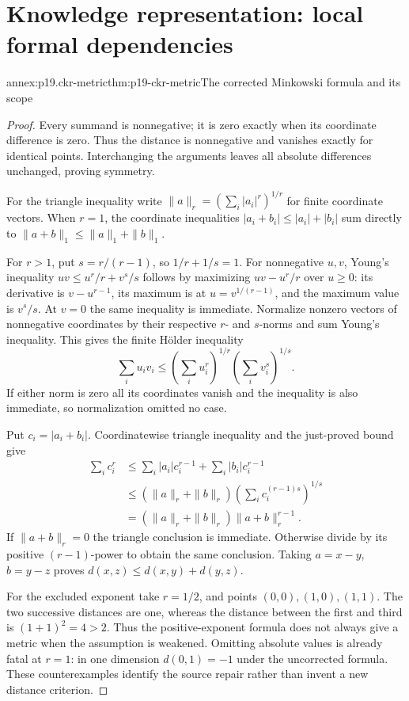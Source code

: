 \section{Knowledge representation: local formal dependencies}
\label{sec:p19-ckr-annex}

\begin{annexitem}{annex:p19.ckr-metric}{thm:p19-ckr-metric}{The corrected Minkowski formula and its scope}
\begin{proof}
Every summand is nonnegative; it is zero exactly when its coordinate
difference is zero. Thus the distance is nonnegative and vanishes
exactly for identical points. Interchanging the arguments leaves
all absolute differences unchanged, proving symmetry.

For the triangle inequality write \(\|a\|_r=(\sum_i|a_i|^r)^{1/r}\)
for finite coordinate vectors. When \(r=1\), the coordinate
inequalities \(|a_i+b_i|\leq|a_i|+|b_i|\) sum directly to
\(\|a+b\|_1\leq\|a\|_1+\|b\|_1\).

For \(r>1\), put \(s=r/(r-1)\), so \(1/r+1/s=1\).
For nonnegative \(u,v\), Young's inequality
\(uv\leq u^r/r+v^s/s\) follows by maximizing
\(uv-u^r/r\) over \(u\geq0\): its derivative is
\(v-u^{r-1}\), its maximum is at \(u=v^{1/(r-1)}\),
and the maximum value is \(v^s/s\). At \(v=0\) the
same inequality is immediate. Normalize nonzero vectors of
nonnegative coordinates by their respective \(r\)- and
\(s\)-norms and sum Young's inequality. This gives the finite
H\"older inequality
\[
 \sum_i u_iv_i\leq
    \left(\sum_i u_i^r\right)^{1/r}
    \left(\sum_i v_i^s\right)^{1/s}.
\]
If either norm is zero all its coordinates vanish and the
inequality is also immediate, so normalization omitted no case.

Put \(c_i=|a_i+b_i|\). Coordinatewise triangle inequality
and the just-proved bound give
\[
\begin{aligned}
 \sum_i c_i^r
 &\leq\sum_i |a_i|c_i^{r-1}+\sum_i|b_i|c_i^{r-1}\\
 &\leq(\|a\|_r+\|b\|_r)
           \left(\sum_i c_i^{(r-1)s}\right)^{1/s}\\
 &=(\|a\|_r+\|b\|_r)\|a+b\|_r^{r-1}.
\end{aligned}
\]
If \(\|a+b\|_r=0\) the triangle conclusion is immediate.
Otherwise divide by its positive \((r-1)\)-power to obtain
the same conclusion. Taking \(a=x-y\), \(b=y-z\)
proves \(d(x,z)\leq d(x,y)+d(y,z)\).

For the excluded exponent take \(r=1/2\), and points
\((0,0),(1,0),(1,1)\). The two successive distances are
one, whereas the distance between the first and third is
\((1+1)^2=4>2\). Thus the positive-exponent formula does
not always give a metric when the assumption is weakened.
Omitting absolute values is already fatal at \(r=1\):
in one dimension \(d(0,1)=-1\) under the uncorrected formula.
These counterexamples identify the source repair rather than
invent a new distance criterion.


\end{proof}
\end{annexitem}
